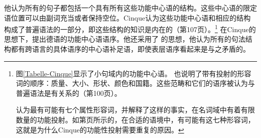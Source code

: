 他认为所有的句子都包括一个具有所有这些功能中心语的结构。这些中心语的限定语位置可以由副词充当或者保持空位。Cinque认为这些功能中心语和相应的结构构成了普遍语法\indexug 的一部分，即这些结构的知识是内在的（第107页）。\footnote{%
图\ref{Tabelle-Cinque}显示了小句域内的功能中心语。 \citet[, 99]{Cinque94a-u} 也说明了带有投射的形容词的顺序：质量、大小、形状、颜色和国籍。这些范畴和它们的语序被认为与普遍语法是有关系的（第100页）。


\citet[]{Cinque94a-u}认为最有可能有七个属性形容词，并解释了这样的事实，在名词域中有着有限数量的功能投射。如第\pageref{Beispiel-Iteration-Adjektive}页所示的，在合适的语境中，有可能有这七种形容词，这就是为什么Cinque的功能性投射需要重复的原因。
}
\citet{Laenzlinger2004a}在Cinque的思想下，提出德语的功能中心语语序。他还采用了 \citet{Kayne94a-u}的思想，他认为所有的句法结构都有跨语言的具体语序的中心语补足语，即使表层语序看起来是与之矛盾的。

